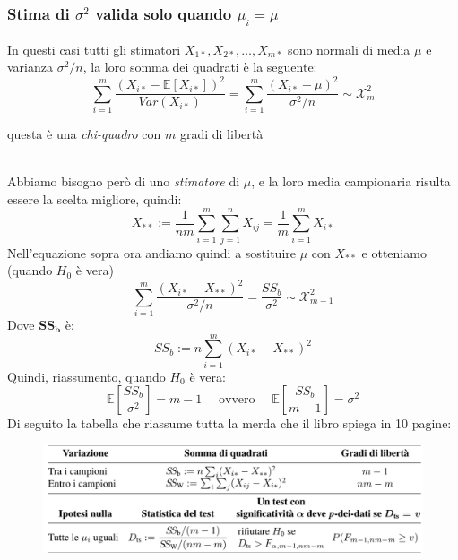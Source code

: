 \documentclass[]{article}
\newcommand{\ev}{\mathbb{E}[X]}
\renewcommand{\ev}[1]{\mathbb{E}\left[#1\right]}
\begin{document}
    \subsubsection{Stima di $\sigma^2$ valida solo quando $\mu_i = \mu$}
    In questi casi tutti gli stimatori $X_{1*}, X_{2*}, \ldots, X_{m*}$ sono normali di media $\mu$ e varianza $\sigma^2/n$, la loro somma dei quadrati è la seguente:
    \[ \sum_{i=1}^{m} \frac{(X_{i*} - \ev{X_{i*}})^2}{Var(X_{i*})} = \sum_{i=1}^{m} \frac{(X_{i*} - \mu)^2}{\sigma^2 / n} \sim \mathcal{X}^2_m \]
    \centerline{questa è una \textit{chi-quadro} con $m$ gradi di libertà} \\[2ex]
    Abbiamo bisogno però di uno \textit{stimatore} di $\mu$, e la loro media campionaria risulta essere la scelta migliore, quindi:
    \[ X_{**} := \frac{1}{nm} \sum_{i=1}^{m} \sum_{j=1}^{n} X_{ij} = \frac{1}{m} \sum_{i=1}^{m} X_{i*} \]
    Nell'equazione sopra ora andiamo quindi a sostituire $\mu$ con $X_{**}$ e otteniamo (quando $H_0$ è vera) 
    \[ \sum_{i=1}^{m} \frac{(X_{i*} - X_{**})^2}{\sigma^2 / n} = \frac{SS_b}{\sigma^2} \sim \mathcal{X}^2_{m-1} \]
    Dove $\boldsymbol{SS_b}$ è:
    \[ SS_b := n \sum_{i=1}^{m} (X_{i*} - X_{**})^2 \]
    Quindi, riassumento, quando $H_0$ è vera:
    \[ \ev{\frac{SS_b}{\sigma^2}} = m -1 \quad \text{ ovvero } \quad \ev{\frac{SS_b}{m-1}} = \sigma^2 \]
    Di seguito la tabella che riassume tutta la merda che il libro spiega in 10 pagine:
    \begin{figure}[H]
        \includegraphics[width=\textwidth]{images/boh_11.png}
    \end{figure}
\end{document}
